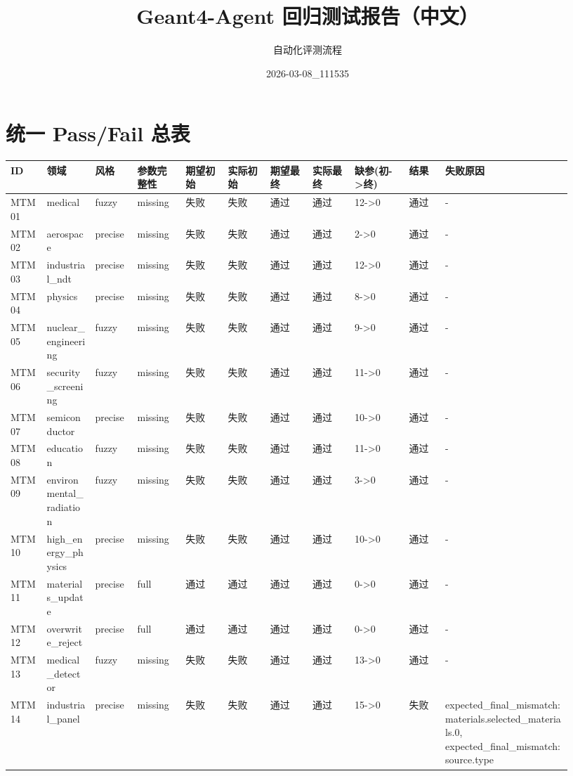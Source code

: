 \documentclass[11pt]{ctexart}
\title{Geant4-Agent 回归测试报告（中文）}
\author{自动化评测流程}
\date{2026-03-08\_111535}
\begin{document}
\maketitle
\section{统一 Pass/Fail 总表}
\begin{longtable}{p{0.06\linewidth}p{0.08\linewidth}p{0.07\linewidth}p{0.08\linewidth}p{0.07\linewidth}p{0.07\linewidth}p{0.07\linewidth}p{0.07\linewidth}p{0.09\linewidth}p{0.06\linewidth}p{0.21\linewidth}}
\toprule
ID & 领域 & 风格 & 参数完整性 & 期望初始 & 实际初始 & 期望最终 & 实际最终 & 缺参(初->终) & 结果 & 失败原因 \\
\midrule
MTM01 & medical & fuzzy & missing & 失败 & 失败 & 通过 & 通过 & 12->0 & 通过 & - \\
MTM02 & aerospace & precise & missing & 失败 & 失败 & 通过 & 通过 & 2->0 & 通过 & - \\
MTM03 & industrial\_ndt & precise & missing & 失败 & 失败 & 通过 & 通过 & 12->0 & 通过 & - \\
MTM04 & physics & precise & missing & 失败 & 失败 & 通过 & 通过 & 8->0 & 通过 & - \\
MTM05 & nuclear\_engineering & fuzzy & missing & 失败 & 失败 & 通过 & 通过 & 9->0 & 通过 & - \\
MTM06 & security\_screening & fuzzy & missing & 失败 & 失败 & 通过 & 通过 & 11->0 & 通过 & - \\
MTM07 & semiconductor & precise & missing & 失败 & 失败 & 通过 & 通过 & 10->0 & 通过 & - \\
MTM08 & education & fuzzy & missing & 失败 & 失败 & 通过 & 通过 & 11->0 & 通过 & - \\
MTM09 & environmental\_radiation & fuzzy & missing & 失败 & 失败 & 通过 & 通过 & 3->0 & 通过 & - \\
MTM10 & high\_energy\_physics & precise & missing & 失败 & 失败 & 通过 & 通过 & 10->0 & 通过 & - \\
MTM11 & materials\_update & precise & full & 通过 & 通过 & 通过 & 通过 & 0->0 & 通过 & - \\
MTM12 & overwrite\_reject & precise & full & 通过 & 通过 & 通过 & 通过 & 0->0 & 通过 & - \\
MTM13 & medical\_detector & fuzzy & missing & 失败 & 失败 & 通过 & 通过 & 13->0 & 通过 & - \\
MTM14 & industrial\_panel & precise & missing & 失败 & 失败 & 通过 & 通过 & 15->0 & 失败 & expected\_final\_mismatch:materials.selected\_materials.0, expected\_final\_mismatch:source.type \\

\end{longtable}
\end{document}
